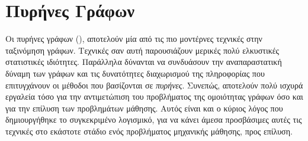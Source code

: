 \section{Πυρήνες Γράφων}
Οι πυρήνες γράφων (), αποτελούν μία από τις πιο μοντέρνες τεχνικές στην ταξινόμηση γράφων.
Τεχνικές σαν αυτή παρουσιάζουν μερικές πολύ ελκυστικές στατιστικές ιδιότητες.
Παράλληλα δύνανται να συνδυάσουν την αναπαραστατική δύναμη των γράφων και τις δυνατότητες διαχωρισμού της πληροφορίας που επιτυγχάνουν οι μέθοδοι που βασίζονται σε \textit{πυρήνες}.
Συνεπώς, αποτελούν πολύ ισχυρά εργαλεία τόσο για την αντιμετώπιση του προβλήματος της ομοιότητας γράφων όσο και για την επίλυση των προβλημάτων μάθησης.
Αυτός είναι και ο κύριος λόγος που δημιουργήθηκε το συγκεκριμένο λογισμικό, για να κάνει άμεσα προσβάσιμες αυτές τις τεχνικές στο εκάστοτε στάδιο ενός προβλήματος μηχανικής μάθησης, προς επίλυση.

